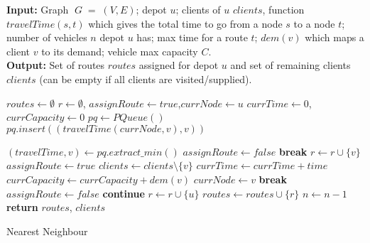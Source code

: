 \documentclass{article}
\begin{document}
\newpage
\begin{algorithm}[H]
\textbf{Input:} Graph $\;G\;=\;(V, E)$; depot $u$; clients of $u$ $clients$, function $travelTime(s,t)$ which gives the total time to go from a node $s$ to a node $t$; number of vehicles $n$ depot $u$ has; max time for a route $t$; $dem(v)$ which maps a client $v$ to its demand; vehicle max capacity $C$.\\
\textbf{Output:} Set of routes $routes$ assigned for depot $u$ and set of remaining clients $clients$ (can be empty if all clients are visited/supplied).
\begin{algorithmic}[1]
        \State $routes \gets \emptyset$
            \State $r\gets \emptyset$\;,\; $assignRoute \gets true$\;,\;$currNode \gets u$
            \State $currTime \gets 0$\;,\;$currCapacity \gets 0$
                \State $pq\gets PQueue()$  
                    \State $pq.insert((travelTime(currNode, v),v))$
                \EndFor
                
                    \State $(travelTime, v) \gets pq.extract\_min()$
                        \State $assignRoute \gets false$
                        \State \textbf{break}
                    \EndIf
                        \State $r \gets r \cup \{v\}$
                        \State $assignRoute \gets true$
                        \State $clients \gets clients \setminus \{v\}$
                        \State $currTime \gets currTime + time$
                        \State $currCapacity \gets currCapacity + dem(v)$
                        \State $currNode \gets v$
                        \State \textbf{break}
                    \Else
                        \State $assignRoute\gets false$
                        \State \textbf{continue}
                    \EndIf
                \EndWhile
            \EndWhile
            \State $r \gets r \cup \{u\}$
            \State $routes\gets routes \cup \{r\}$
            \State $n\gets n-1$
        \EndWhile
    \State \textbf{return} $routes$, $clients$
    \EndFunction
\end{algorithmic}
\caption{Nearest Neighbour}
\end{algorithm}
\end{document}
